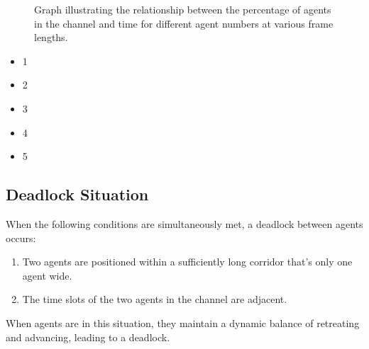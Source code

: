 {\begin{figure}[htb]
    \caption{Graph illustrating the relationship between the percentage of agents in the channel and time for different agent numbers at various frame lengths.}
    \label{fig:grid}
\end{figure}




\begin{itemize}
    \item 1
    \item 2
    \item 3
    \item 4
    \item 5
\end{itemize}

}

\subsection{Deadlock Situation}

When the following conditions are simultaneously met, a deadlock between agents occurs:
\begin{enumerate}
    \item 
    Two agents are positioned within a sufficiently long corridor that's only one agent wide.
    \item
    The time slots of the two agents in the channel are adjacent. 
\end{enumerate}

When agents are in this situation, they maintain a dynamic balance of retreating and advancing, leading to a deadlock.